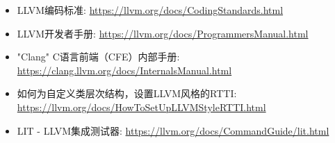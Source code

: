 \begin{itemize}
\item
LLVM编码标准: \url{https://llvm.org/docs/CodingStandards.html}

\item
LLVM开发者手册: \url{https://llvm.org/docs/ProgrammersManual.html}

\item
"Clang" C语言前端（CFE）内部手册: \url{https://clang.llvm.org/docs/InternalsManual.html}

\item
如何为自定义类层次结构，设置LLVM风格的RTTI: \url{https://llvm.org/docs/HowToSetUpLLVMStyleRTTI.html}

\item
LIT - LLVM集成测试器: \url{https://llvm.org/docs/CommandGuide/lit.html}
\end{itemize}
